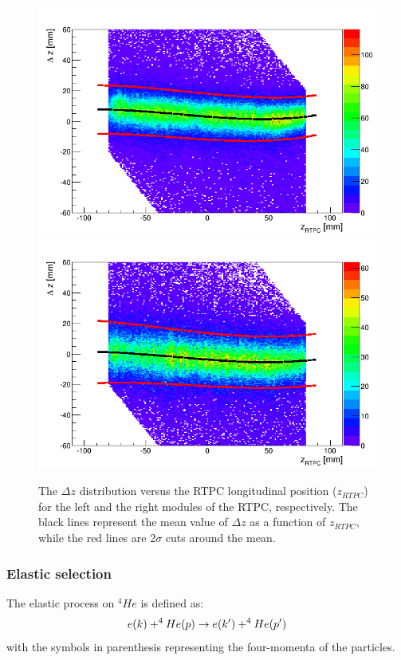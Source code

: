 \begin{itemize}
\begin{figure}[tbp]
\includegraphics[scale=0.34]{fig_rtpc/delta_z_z_l.png}
\includegraphics[scale=0.34]{fig_rtpc/delta_z_z_r.png}
\caption{The $\Delta z$ distribution versus the RTPC longitudinal position ($z_{RTPC}$) for the left and the right modules of the RTPC, respectively. The black lines represent the mean value of $\Delta z$ as a function of $z_{RTPC}$, while the red lines are 2$\sigma$ cuts around the mean.} 
\label{fig:rrtpc_delta_z}
\end{figure}  
\end{itemize}


\subsubsection{Elastic selection}
   The elastic process on $^{4}He$ is defined as:
\begin{equation}
\centering
e(k) + ^{4}He(p) \rightarrow e(k') + ^{4}He(p')
\end{equation}
with the symbols in parenthesis representing the four-momenta of the particles. \\

